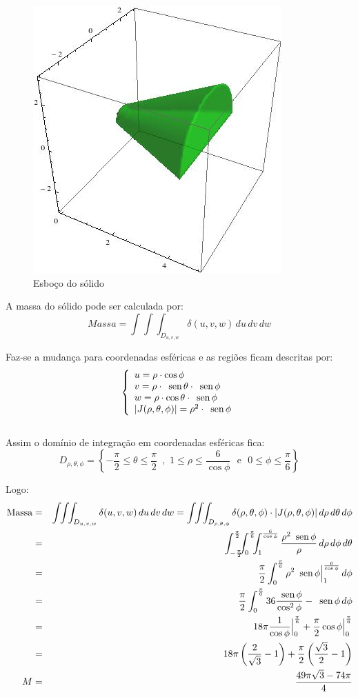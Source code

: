 \documentclass[12pt,a4paper]{article}
\newcommand{\sen}{\mbox{\, sen}\,}
\begin{document}
\begin{figure}[h!]
	\centering
	\includegraphics[scale=0.5]{Q3A.jpg}  
	\caption{Esboço do sólido}
	\label{fig:figura12}
\end{figure}

A massa do sólido pode ser calculada por:
$$ Massa = \int\!\!\int\!\!\int_{D_{u,v,w}} \delta(u,v,w)\,du\,dv\,dw $$

Faz-se a mudança para coordenadas esféricas e as regiões ficam descritas por:
$$\left\{\begin{array}{lc}
u=\rho \cdot \cos{\phi}\\
v=\rho \cdot \sen{\theta}\cdot \sen{\phi}\\
w=\rho \cdot \cos{\theta}\cdot \sen{\phi} \\
|J(\rho,\theta,\phi)|=\rho^2 \cdot \sen{\phi}
\end{array}\right.
$$
\\
Assim o domínio de integração em coordenadas esféricas fica:\\
$$D_{\rho,\theta,\phi}= \left\{- \frac{\pi}{2}  \leq \theta \leq \frac{\pi}{2} \, \,\, , \,\, 1 \leq \rho \leq \frac{6}{\cos{\phi}}\, \, \mbox{  e  } 
\,\,0 \leq \phi \leq \frac{\pi}{6}\right\}$$

Logo:
\begin{eqnarray*}
\mbox{Massa} &=& \int\!\!\int\!\!\int_{D_{u,v,w}} \delta(u,v,w)\,du\,dv\,dw = \int\!\!\int\!\!\int_{D_{\rho,\theta,\phi}} \delta(\rho,\theta,\phi)\cdot |J(\rho,\theta,\phi)|\,d\rho\,d\theta\,d\phi\\
&=& \int_{-\frac{\pi}{2}}^{\frac{\pi}{2}}\!\!\!\int_{0}^{\frac{\pi}{6}}\!\!\!\int_1^{\frac{6}{\cos{\phi}}}\frac{\rho^2\sen{\phi}}{\rho}\,d\rho\,d\phi\,d\theta\\
&=& \frac{\pi}{2} \int_0^{\frac{\pi}{6}} \rho^2\sen{\phi}\Big|_1^{\frac{6}{\cos{\phi}}}\,d\phi\\
&=& \frac{\pi}{2} \int_0^{\frac{\pi}{6}} 36\frac{\sen{\phi}}{\cos^2{\phi}}-\sen{\phi}\,d\phi\\
&=& 18\pi \frac{1}{\cos{\phi}}\Big|_0^{\frac{\pi}{6}} + \frac{\pi}{2}\cos{\phi}\Big|_0^{\frac{\pi}{6}}\\
&=& 18\pi\left(\frac{2}{\sqrt{3}}-1\right) + \frac{\pi}{2}\left(\frac{\sqrt{3}}{2}-1\right)\\
M &=& \frac{49 \pi \sqrt{3} - 74 \pi}{4}
\end{eqnarray*}
\end{document}
